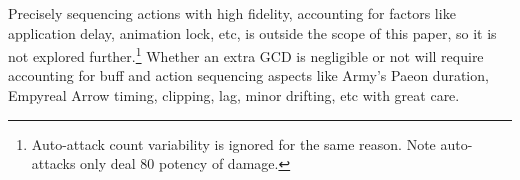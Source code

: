 Precisely sequencing actions with high fidelity, accounting for factors like application delay, animation lock, etc, is outside the scope of this paper, so it is not explored further.\footnote{Auto-attack count variability is ignored for the same reason. Note auto-attacks only deal 80 potency of damage.} Whether an extra GCD is negligible or not will require accounting for buff and action sequencing aspects like Army's Paeon duration, Empyreal Arrow timing, clipping, lag, minor drifting, etc with great care.

